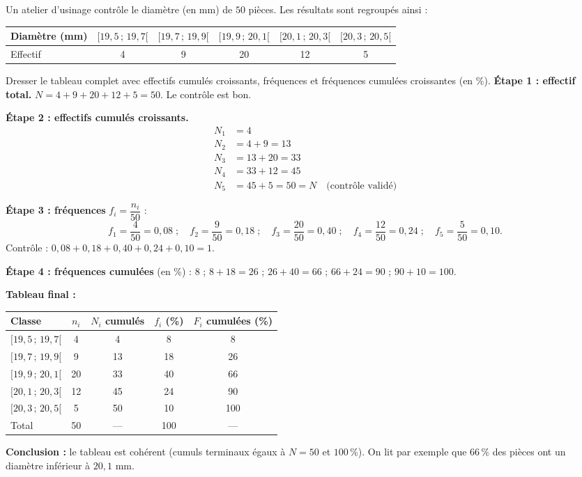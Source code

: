 \documentclass[11pt]{article}
\begin{document}
\begin{exoresolu}
Un atelier d'usinage contrôle le diamètre (en mm) de $50$ pièces. Les résultats sont regroupés ainsi :
\begin{center}
\begin{tabular}{|l|ccccc|}
\hline
\rowcolor{popblueL} Diamètre (mm) & $[19,5\,;\,19,7[$ & $[19,7\,;\,19,9[$ & $[19,9\,;\,20,1[$ & $[20,1\,;\,20,3[$ & $[20,3\,;\,20,5[$ \\
\hline
Effectif & 4 & 9 & 20 & 12 & 5 \\
\hline
\end{tabular}
\end{center}
Dresser le tableau complet avec effectifs cumulés croissants, fréquences et fréquences cumulées croissantes (en \%).
\tcblower
\textbf{Étape 1 : effectif total.} $N = 4+9+20+12+5 = 50$. Le contrôle est bon.
\smallskip

\textbf{Étape 2 : effectifs cumulés croissants.}
\begin{align*}
N_1 &= 4 \\
N_2 &= 4+9 = 13 \\
N_3 &= 13+20 = 33 \\
N_4 &= 33+12 = 45 \\
N_5 &= 45+5 = 50 = N \quad \text{(contrôle validé)}
\end{align*}

\textbf{Étape 3 : fréquences} $f_i=\dfrac{n_i}{50}$ :
\[ f_1=\frac{4}{50}=0{,}08 \;;\quad f_2=\frac{9}{50}=0{,}18 \;;\quad f_3=\frac{20}{50}=0{,}40 \;;\quad f_4=\frac{12}{50}=0{,}24 \;;\quad f_5=\frac{5}{50}=0{,}10. \]
Contrôle : $0{,}08+0{,}18+0{,}40+0{,}24+0{,}10 = 1$. 

\textbf{Étape 4 : fréquences cumulées} (en \%) : $8$ ; $8+18=26$ ; $26+40=66$ ; $66+24=90$ ; $90+10=100$.

\textbf{Tableau final :}
\begin{center}
\begin{tabular}{|l|c|c|c|c|}
\hline
\rowcolor{popblueL} Classe & $n_i$ & $N_i$ cumulés & $f_i$ (\%) & $F_i$ cumulées (\%) \\
\hline
$[19,5\,;\,19,7[$ & 4 & 4 & 8 & 8 \\
\hline
$[19,7\,;\,19,9[$ & 9 & 13 & 18 & 26 \\
\hline
$[19,9\,;\,20,1[$ & 20 & 33 & 40 & 66 \\
\hline
$[20,1\,;\,20,3[$ & 12 & 45 & 24 & 90 \\
\hline
$[20,3\,;\,20,5[$ & 5 & 50 & 10 & 100 \\
\hline
\rowcolor{popcream} Total & 50 & --- & 100 & --- \\
\hline
\end{tabular}
\end{center}
\textbf{Conclusion :} le tableau est cohérent (cumuls terminaux égaux à $N=50$ et $100\,\%$). On lit par exemple que $66\,\%$ des pièces ont un diamètre inférieur à $20{,}1$ mm.
\end{exoresolu}
\end{document}
